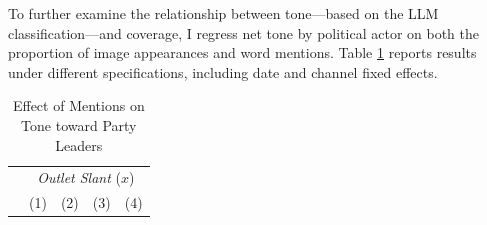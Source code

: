 \documentclass[12pt]{article}
\begin{document}
To further examine the relationship between tone—based on the LLM classification—and coverage, I regress net tone by political actor on both the proportion of image appearances and word mentions. Table \ref{tab:images2} reports results under different specifications, including date and channel fixed effects.




\begin{table}[htbp!]
	\centering
	
	\caption{Effect of Mentions on Tone toward Party Leaders}
	\label{tab:images2}
	\small
	\setlength{\tabcolsep}{4pt}
	\renewcommand{\arraystretch}{1.0}
	\begin{tabular}{lcccc}
		\toprule
		& \multicolumn{4}{c}{\textit{Outlet Slant} (\(x\))} \\
		\cmidrule(lr){2-5}
		& (1) & (2) & (3) & (4) \\
		\midrule
		

\end{tabular}
\end{table}
\end{document}
